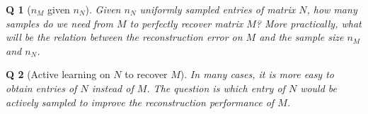 \documentclass{article} %
\newtheorem{question}{Q}
\begin{document}
\begin{question}[$n_M$ given $n_N$]
Given $n_N$ uniformly sampled entries of matrix $N$, how many samples do we need from $M$ to perfectly recover matrix $M$? More practically, what will be the relation between the reconstruction error on $M$ and the sample size $n_M$ and $n_N$.
\end{question}

\begin{question}[Active learning on $N$ to recover $M$]
In many cases, it is more easy to obtain entries of $N$ instead of $M$. The question is which entry of $N$ would be actively sampled to improve the reconstruction performance of $M$.
\end{question}





\end{document}
